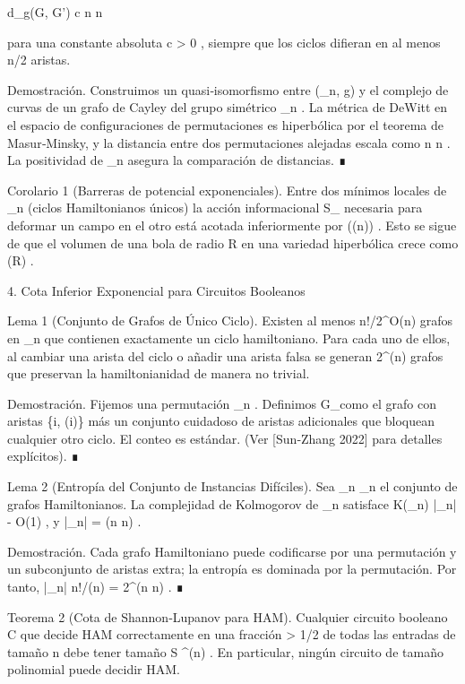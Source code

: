 \documentclass[12pt,a4paper]{book}
\begin{document}
d_g(G, G') \ge c \cdot n \log n

para una constante absoluta  c > 0 , siempre que los ciclos difieran en al menos  n/2  aristas.

Demostración. Construimos un quasi‑isomorfismo entre  (_n, g)  y el complejo de curvas de un grafo de Cayley del grupo simétrico  _n . La métrica de DeWitt en el espacio de configuraciones de permutaciones es hiperbólica por el teorema de Masur‑Minsky, y la distancia entre dos permutaciones alejadas escala como  n \log n . La positividad de  \rho_n  asegura la comparación de distancias. ∎

Corolario 1 (Barreras de potencial exponenciales).
Entre dos mínimos locales de  \rho_n  (ciclos Hamiltonianos únicos) la acción informacional  S_{}  necesaria para deformar un campo en el otro está acotada inferiormente por  \exp(\Omega(n)) . Esto se sigue de que el volumen de una bola de radio  R  en una variedad hiperbólica crece como  \exp(\dim \cdot R) .

4. Cota Inferior Exponencial para Circuitos Booleanos

Lema 1 (Conjunto de Grafos de Único Ciclo).
Existen al menos  n!/2^{O(n)}  grafos en  _n  que contienen exactamente un ciclo hamiltoniano. Para cada uno de ellos, al cambiar una arista del ciclo o añadir una arista falsa se generan  2^{\Omega(n)}  grafos que preservan la hamiltonianidad de manera no trivial.

Demostración. Fijemos una permutación  \sigma \in {}_n . Definimos  G_\sigma  como el grafo con aristas  \{i, \sigma(i)\}  más un conjunto cuidadoso de aristas adicionales que bloquean cualquier otro ciclo. El conteo es estándar. (Ver [Sun‑Zhang 2022] para detalles explícitos). ∎

Lema 2 (Entropía del Conjunto de Instancias Difíciles).
Sea  _n \subset {}_n  el conjunto de grafos Hamiltonianos. La complejidad de Kolmogorov de  _n  satisface  K(_n) \ge \log |_n| - O(1) , y  \log |_n| = \Omega(n \log n) .

Demostración. Cada grafo Hamiltoniano puede codificarse por una permutación y un subconjunto de aristas extra; la entropía es dominada por la permutación. Por tanto,  |_n| \ge n!/(n) = 2^{\Omega(n \log n)} . ∎

Teorema 2 (Cota de Shannon‑Lupanov para HAM).
Cualquier circuito booleano  C  que decide HAM correctamente en una fracción  \delta > 1/2  de todas las entradas de tamaño  n  debe tener tamaño  S \ge \delta {}^{\Omega(n)} . En particular, ningún circuito de tamaño polinomial puede decidir HAM.
\end{document}
